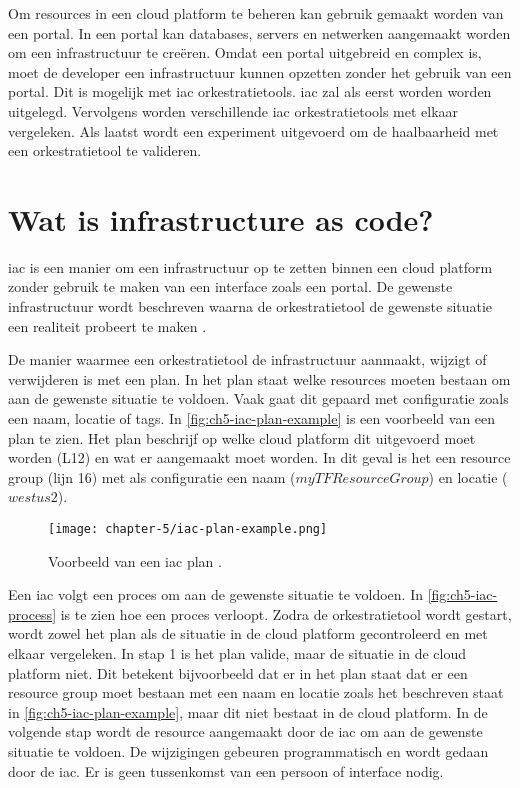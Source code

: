 Om resources in een cloud platform te beheren kan gebruik gemaakt worden van een portal. In een portal kan databases, servers en netwerken aangemaakt worden om een infrastructuur te creëren. Omdat een portal uitgebreid en complex is, moet de developer een infrastructuur kunnen opzetten zonder het gebruik van een portal. Dit is mogelijk met \acrfull{iac} orkestratietools. \Acrshort{iac} zal als eerst worden worden uitgelegd. Vervolgens worden verschillende \Acrshort{iac} orkestratietools met elkaar vergeleken. Als laatst wordt een experiment uitgevoerd om de haalbaarheid met een orkestratietool te valideren.

\section{Wat is infrastructure as code?}\label{subsec:ch5-wat-is-infrastructure-as-code}
\acrshort{iac} is een manier om een infrastructuur op te zetten binnen een cloud platform zonder gebruik te maken van een interface zoals een portal. De gewenste infrastructuur wordt beschreven waarna de orkestratietool de gewenste situatie een realiteit probeert te maken \cite{iac-amazon-web-services-in-action}.

De manier waarmee een orkestratietool de infrastructuur aanmaakt, wijzigt of verwijderen is met een plan. In het plan staat welke resources moeten bestaan om aan de gewenste situatie te voldoen. Vaak gaat dit gepaard met configuratie zoals een naam, locatie of tags. In \autoref{fig:ch5-iac-plan-example} is een voorbeeld van een plan te zien. Het plan beschrijf op welke cloud platform dit uitgevoerd moet worden (L12) en wat er aangemaakt moet worden. In dit geval is het een resource group (lijn 16) met als configuratie een naam (\(myTFResourceGroup\)) en locatie (\(westus2\)).

\begin{figure}[hbt!]
  \centering
  \texttt{[image: chapter-5/iac-plan-example.png]}
  \caption{Voorbeeld van een \acrfull{iac} plan \cite{terraform-plan-example}.}
  \label{fig:ch5-iac-plan-example}
\end{figure}

Een \Acrshort{iac} volgt een proces om aan de gewenste situatie te voldoen. In \autoref{fig:ch5-iac-process} is te zien hoe een proces verloopt. Zodra de orkestratietool wordt gestart, wordt zowel het plan als de situatie in de cloud platform gecontroleerd en met elkaar vergeleken. In stap 1 is het plan valide, maar de situatie in de cloud platform niet. Dit betekent bijvoorbeeld dat er in het plan staat dat er een resource group moet bestaan met een naam en locatie zoals het beschreven staat in \autoref{fig:ch5-iac-plan-example}, maar dit niet bestaat in de cloud platform. In de volgende stap wordt de resource aangemaakt door de \Acrshort{iac} om aan de gewenste situatie te voldoen. De wijzigingen gebeuren programmatisch en wordt gedaan door de \Acrshort{iac}. Er is geen tussenkomst van een persoon of interface nodig. 

